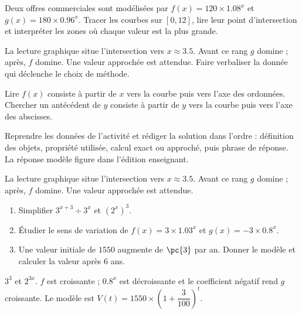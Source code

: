 \begin{activity}
Deux offres commerciales sont modélisées par $f(x)=120\times\num{1,08}^x$ et $g(x)=180\times\num{0,96}^x$. Tracer les courbes sur $[0,12]$, lire leur point d'intersection et interpréter les zones où chaque valeur est la plus grande.
\begin{center}\end{center}
\end{activity}
\begin{solution}La lecture graphique situe l'intersection vers $x\approx\num{3,5}$. Avant ce rang $g$ domine ; après, $f$ domine. Une valeur approchée est attendue. Faire verbaliser la donnée qui déclenche le choix de méthode.\end{solution}

\begin{summary}Lire $f(x)$ consiste à partir de $x$ vers la courbe puis vers l'axe des ordonnées. Chercher un antécédent de $y$ consiste à partir de $y$ vers la courbe puis vers l'axe des abscisses.\end{summary}

\begin{example}
Reprendre les données de l'activité et rédiger la solution dans l'ordre : définition des objets, propriété utilisée, calcul exact ou approché, puis phrase de réponse. La réponse modèle figure dans l'édition enseignant.
\end{example}
\begin{solution}La lecture graphique situe l'intersection vers $x\approx\num{3,5}$. Avant ce rang $g$ domine ; après, $f$ domine. Une valeur approchée est attendue.\end{solution}

\begin{exercise}[essentiel]
\begin{enumerate}\item Simplifier $3^{x+3}\div3^x$ et $(2^x)^3$.\item Étudier le sens de variation de $f(x)=3\times\num{1,03}^x$ et $g(x)=-3\times\num{0,8}^x$.\item Une valeur initiale de $1550$ augmente de $\pc{3}$ par an. Donner le modèle et calculer la valeur après $6$ ans.\end{enumerate}
\end{exercise}
\begin{solution}$3^3$ et $2^{3x}$. $f$ est croissante ; $\num{0,8}^x$ est décroissante et le coefficient négatif rend $g$ croissante. Le modèle est $V(t)=1550\times\left(1+\dfrac{3}{100}\right)^t$.\end{solution}

